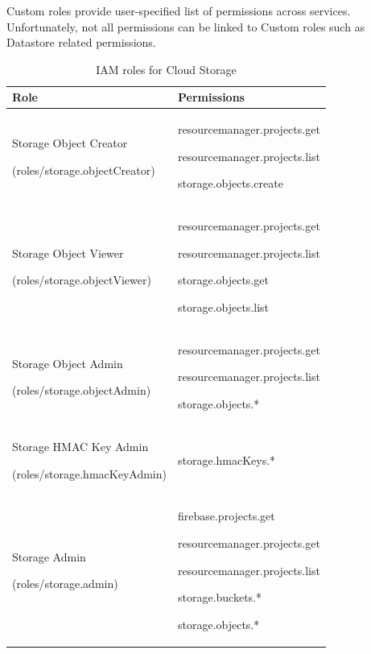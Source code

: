 \documentclass[sigconf]{acmart}
\begin{document}
Custom roles provide user-specified list of permissions across services. Unfortunately, not all permissions can be linked to Custom roles such as Datastore related permissions.


\begin{table}[t]
    \begin{center}
    \begin{tabular}{|p{4cm}|p{4cm}|}
    \hline
    Role & Permissions\\
    \hline
    \hline
    Storage Object Creator\par(roles/storage.objectCreator) &  resourcemanager.projects.get  \par resourcemanager.projects.list \par storage.objects.create \\ %
    \hline
    Storage Object Viewer\par(roles/storage.objectViewer) & resourcemanager.projects.get\par resourcemanager.projects.list\par storage.objects.get\par storage.objects.list \\ %
    \hline
    Storage Object Admin\par(roles/storage.objectAdmin) & resourcemanager.projects.get \par resourcemanager.projects.list\par storage.objects.*\\ %
    \hline
    Storage HMAC Key Admin\par(roles/storage.hmacKeyAdmin) &storage.hmacKeys.*\\
    \hline
     Storage Admin\par(roles/storage.admin) &firebase.projects.get\par resourcemanager.projects.get\par resourcemanager.projects.list\par storage.buckets.*\par storage.objects.*\\
    \hline
    \end{tabular}
    \caption{IAM roles for Cloud Storage}
    \vspace{-0.20in}
    \label{table:sto-role}
    \end{center}
\end{table}
\end{document}
